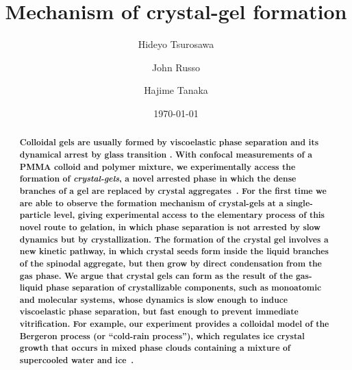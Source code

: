 \documentclass[a4paper,preprint,superscriptaddress]{revtex4}
\begin{document}
\title{Mechanism of crystal-gel formation}
\author{Hideyo Tsurosawa}
\author{John Russo}
\author{Hajime Tanaka}


\date{\today}

\begin{abstract}
{\bf 
Colloidal gels are usually formed by viscoelastic phase separation and its dynamical arrest by glass transition \cite{tanaka1999colloid,tanaka2000viscoelastic,foffi2002,lu2008gelation,zaccarelli2008gelation,testard2011}.
With confocal measurements of a PMMA colloid and polymer mixture, we experimentally access the formation of \emph{crystal-gels}, a novel arrested phase in which the dense branches of a gel are replaced by crystal aggregates~\cite{fortini2008crystallization,perez2011pathways,sabin2012}. 
For the first time we are able to observe the formation mechanism of crystal-gels at a single-particle level, giving experimental access to the elementary process of this novel route to gelation, in which phase separation is not arrested by slow dynamics but by crystallization.
The formation of the crystal gel  involves a new kinetic pathway, in which crystal seeds form inside the liquid branches of the spinodal aggregate, but then grow by direct condensation from the gas phase.
We argue that crystal gels can form as the result of the gas-liquid phase separation of crystallizable components, such as monoatomic and molecular systems, whose dynamics is slow enough to induce viscoelastic phase separation, but fast enough to prevent immediate vitrification.
For example, our experiment provides a colloidal model of the Bergeron process (or ``cold-rain process''), which regulates ice crystal growth that occurs in mixed phase clouds containing a mixture of supercooled water and ice~\cite{glickman2000glossary}.
}
\end{abstract}
 
\end{document}
